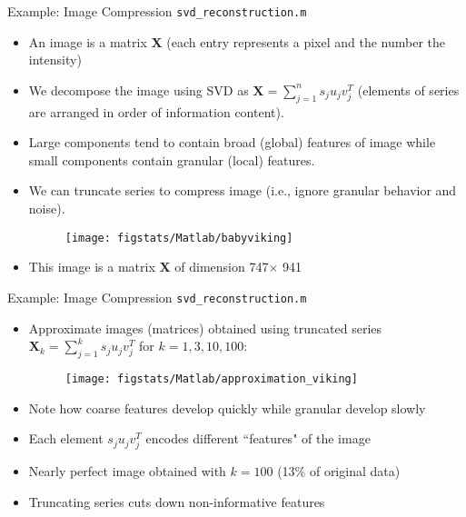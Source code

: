 \documentclass[handout,9pt]{beamer}
\begin{document}
\begin{frame}{Example: Image Compression \footnotesize{\texttt{svd\_reconstruction.m}}}

\begin{itemize}
\setlength{\itemsep}{5pt}
\item An image is a matrix $\mathbf{X}$ (each entry represents a pixel and the number the intensity)
\item We decompose the image using SVD as $\mathbf{X}=\sum_{j=1}^ns_ju_jv_j^T$ (elements of series are arranged in order of information content). 
\item Large components tend to contain broad (global) features of image while small components contain granular (local) features. 
\item We can truncate series to compress image (i.e., ignore granular behavior and noise).


\begin{figure}[!htb]
    \centering
	\texttt{[image: figstats/Matlab/babyviking]}
\end{figure}

\item This image is a matrix $\mathbf{X}$ of dimension 747$\times$ 941
\end{itemize}

\end{frame}


\begin{frame}{Example: Image Compression \footnotesize{\texttt{svd\_reconstruction.m}}}

\begin{itemize}
\item Approximate images (matrices) obtained using truncated series $\mathbf{X}_k=\sum_{j=1}^ks_ju_jv_j^T$ for $k=1,3,10,100$:


\begin{figure}[!htb]
    \centering
	\texttt{[image: figstats/Matlab/approximation\_viking]}
\end{figure}

\item Note how coarse features develop quickly while granular develop slowly
\item Each element $s_ju_jv_j^T$ encodes different ``features" of the image
\item Nearly perfect image obtained with $k=100$ (13\% of original data)
\item Truncating series cuts down non-informative features
\end{itemize}
\end{frame}
\end{document}
